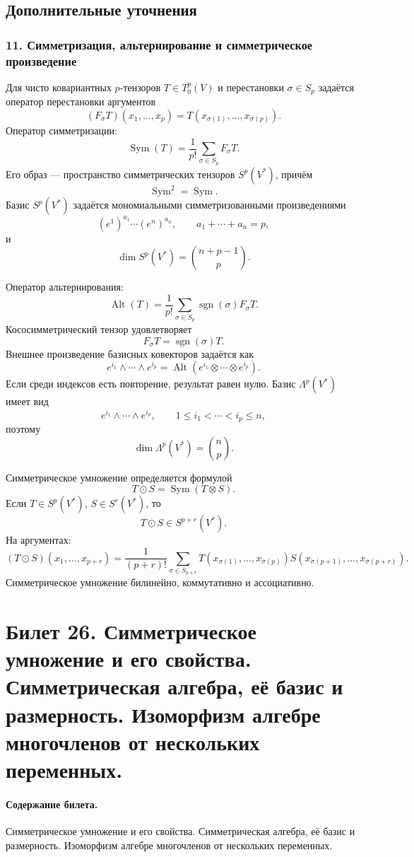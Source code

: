 \documentclass[12pt,a4paper]{article}
\theoremstyle{definition}
\theoremstyle{plain}
\theoremstyle{remark}
\newcommand{\Sym}{\operatorname{Sym}}
\newcommand{\Alt}{\operatorname{Alt}}
\providecommand{\sgn}{\operatorname{sgn}}
\begin{document}
\subsection*{Дополнительные уточнения}

\subsubsection*{11. Симметризация, альтернирование и симметрическое произведение}
Для чисто ковариантных $p$-тензоров $T\in T^p_0(V)$ и перестановки $\sigma\in S_p$ задаётся оператор перестановки аргументов
\[
    (F_\sigma T)(x_1,\ldots,x_p)=T(x_{\sigma(1)},\ldots,x_{\sigma(p)}).
\]
Оператор симметризации:
\[
    \Sym(T)=\frac1{p!}\sum_{\sigma\in S_p}F_\sigma T.
\]
Его образ --- пространство симметрических тензоров $S^p(V^*)$, причём
\[
    \Sym^2=\Sym.
\]
Базис $S^p(V^*)$ задаётся мономиальными симметризованными произведениями
\[
    (e^1)^{a_1}\cdots (e^n)^{a_n},
    \qquad
    a_1+\cdots+a_n=p,
\]
и
\[
    \dim S^p(V^*)=\binom{n+p-1}{p}.
\]

Оператор альтернирования:
\[
    \Alt(T)=\frac1{p!}\sum_{\sigma\in S_p}\sgn(\sigma)F_\sigma T.
\]
Кососимметрический тензор удовлетворяет
\[
    F_\sigma T=\sgn(\sigma)T.
\]
Внешнее произведение базисных ковекторов задаётся как
\[
    e^{i_1}\wedge\cdots\wedge e^{i_p}
    =\Alt(e^{i_1}\otimes\cdots\otimes e^{i_p}).
\]
Если среди индексов есть повторение, результат равен нулю. Базис $\Lambda^p(V^*)$ имеет вид
\[
    e^{i_1}\wedge\cdots\wedge e^{i_p},
    \qquad
    1\le i_1<\cdots<i_p\le n,
\]
поэтому
\[
    \dim\Lambda^p(V^*)=\binom np.
\]

Симметрическое умножение определяется формулой
\[
    T\odot S=\Sym(T\otimes S).
\]
Если $T\in S^p(V^*)$, $S\in S^r(V^*)$, то
\[
    T\odot S\in S^{p+r}(V^*).
\]
На аргументах:
\[
    (T\odot S)(x_1,\ldots,x_{p+r})
    =\frac1{(p+r)!}\sum_{\sigma\in S_{p+r}}
    T(x_{\sigma(1)},\ldots,x_{\sigma(p)})
    S(x_{\sigma(p+1)},\ldots,x_{\sigma(p+r)}).
\]
Симметрическое умножение билинейно, коммутативно и ассоциативно.

\clearpage

\section{Билет 26. Симметрическое умножение и его свойства. Симметрическая алгебра, её базис и размерность. Изоморфизм алгебре многочленов от нескольких переменных.}

\paragraph{Содержание билета.} Симметрическое умножение и его свойства. Симметрическая алгебра, её базис и размерность. Изоморфизм алгебре многочленов от нескольких переменных.
\end{document}
